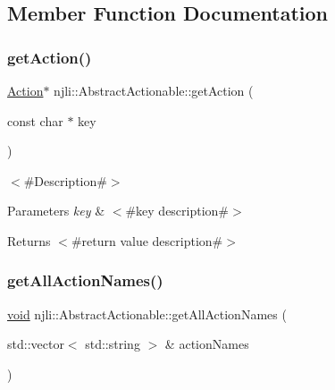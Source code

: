 \subsection{Member Function Documentation}
\mbox{\label{classnjli_1_1_abstract_actionable_a2e853aeb7805f7fb878acc2f4ebafadb}} 
\subsubsection{\texorpdfstring{get\+Action()}{getAction()}}
{\footnotesize\ttfamily \mbox{\hyperlink{classnjli_1_1_action}{Action}}$\ast$ njli\+::\+Abstract\+Actionable\+::get\+Action (\begin{DoxyParamCaption}\item[{const char $\ast$}]{key }\end{DoxyParamCaption})}

$<$\#\+Description\#$>$


\begin{DoxyParams}{Parameters}
{\em key} & $<$\#key description\#$>$\\
\hline
\end{DoxyParams}
\begin{DoxyReturn}{Returns}
$<$\#return value description\#$>$ 
\end{DoxyReturn}
\mbox{\label{classnjli_1_1_abstract_actionable_a9df58912375974fd1e5da088e4d4225d}} 
\subsubsection{\texorpdfstring{get\+All\+Action\+Names()}{getAllActionNames()}}
{\footnotesize\ttfamily \mbox{\hyperlink{_thread_8h_af1e856da2e658414cb2456cb6f7ebc66}{void}} njli\+::\+Abstract\+Actionable\+::get\+All\+Action\+Names (\begin{DoxyParamCaption}\item[{std\+::vector$<$ std\+::string $>$ \&}]{action\+Names }\end{DoxyParamCaption})\hspace{0.3cm}{\ttfamily [protected]}}

